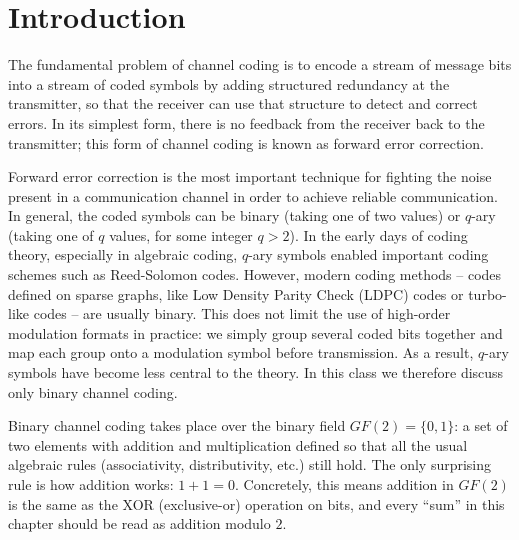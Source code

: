 
\Contributor{}

\lstset{style=mystyle}

	\MakeScribeTop

\section{Introduction}
The fundamental problem of channel coding is to encode a stream of message bits into a stream of coded symbols by adding structured redundancy at the transmitter, so that the receiver can use that structure to detect and correct errors. In its simplest form, there is no feedback from the receiver back to the transmitter; this form of channel coding is known as forward error correction.

Forward error correction is the most important technique for fighting the noise present in a communication channel in order to achieve reliable communication. In general, the coded symbols can be binary (taking one of two values) or $q$-ary (taking one of $q$ values, for some integer $q > 2$). In the early days of coding theory, especially in algebraic coding, $q$-ary symbols enabled important coding schemes such as Reed-Solomon codes. However, modern coding methods -- codes defined on sparse graphs, like Low Density Parity Check (LDPC) codes or turbo-like codes -- are usually binary. This does not limit the use of high-order modulation formats in practice: we simply group several coded bits together and map each group onto a modulation symbol before transmission. As a result, $q$-ary symbols have become less central to the theory. In this class we therefore discuss only binary channel coding.

Binary channel coding takes place over the binary field \(GF(2) = \{0, 1\}\): a set of two elements with addition and multiplication defined so that all the usual algebraic rules (associativity, distributivity, etc.) still hold. The only surprising rule is how addition works: \(1 + 1 = 0\). Concretely, this means addition in \(GF(2)\) is the same as the XOR (exclusive-or) operation on bits, and every ``sum'' in this chapter should be read as addition modulo \(2\).


